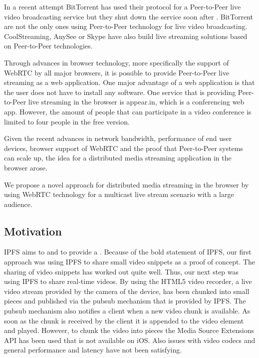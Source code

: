 In a recent attempt BitTorrent has used their protocol for a Peer-to-Peer live video broadcasting service \cite{bittorrent-live} but they shut down the service soon after \cite{bittorrent-live-shutdown}. BitTorrent are not the only ones using Peer-to-Peer technology for live video broadcasting. CoolStreaming, AnySee or Skype have also build live streaming solutions based on Peer-to-Peer technologies.

Through advances in browser technology, more specifically the support of WebRTC by all major browsers, it is possible to provide Peer-to-Peer live streaming as a web application. One major advantage of a web application is that the user does not have to install any software. 
One service that is providing Peer-to-Peer live streaming in the browser is appear.in, which is a conferencing web app. However, the amount of people that can participate in a video conference is limited to four people in the free version.

Given the recent advances in network bandwidth, performance of end user devices, browser support of WebRTC and the proof that Peer-to-Peer systems can scale up, the idea for a distributed media streaming application in the browser arose.

We propose a novel approach for distributed media streaming in the browser by using WebRTC technology for a multicast live stream scenario with a large audience.

\subsection{Motivation}
IPFS aims to  and to provide a  \cite{ipfs-website}.
Because of the bold statement of IPFS, our first approach was using IPFS to share small video snippets as a proof of concept. The sharing of video snippets has worked out quite well. Thus, our next step was using IPFS to share real-time videos. By using the HTML5 video recorder, a live video stream provided by the camera of the device, has been chunked into small pieces and published via the pubsub mechanism that is provided by IPFS. The pubsub mechanism also notifies a client when a new video chunk is available. As soon as the chunk is received by the client it is appended to the video element and played. However, to chunk the video into pieces the Media Source Extensions API has been used that is not available on iOS. Also issues with video codecs and general performance and latency have not been satisfying.

